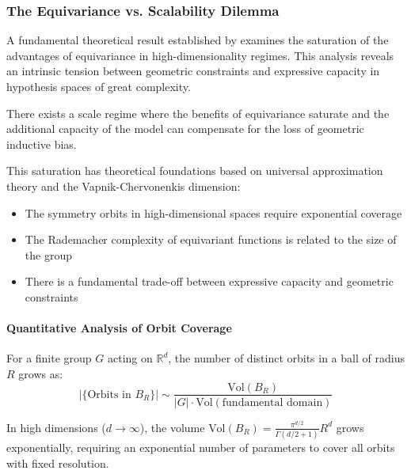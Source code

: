 \subsubsection{The Equivariance vs. Scalability Dilemma}\label{subsubsec:dilema_equivarianza_escalabilidad}

A fundamental theoretical result established by \citet{park2024equivariancescale} examines the saturation of the advantages of equivariance in high-dimensionality regimes. This analysis reveals an intrinsic tension between geometric constraints and expressive capacity in hypothesis spaces of great complexity.

\begin{hypothesis}
There exists a scale regime where the benefits of equivariance saturate and the additional capacity of the model can compensate for the loss of geometric inductive bias.
\end{hypothesis}

This saturation has theoretical foundations based on universal approximation theory and the Vapnik-Chervonenkis dimension:

\begin{itemize}
\item The symmetry orbits in high-dimensional spaces require exponential coverage
\item The Rademacher complexity of equivariant functions is related to the size of the group
\item There is a fundamental trade-off between expressive capacity and geometric constraints
\end{itemize}

\paragraph{Quantitative Analysis of Orbit Coverage}

For a finite group $G$ acting on $\mathbb{R}^d$, the number of distinct orbits in a ball of radius $R$ grows as:
\begin{equation}
|\{\text{Orbits in } B_R\}| \sim \frac{\text{Vol}(B_R)}{|G| \cdot \text{Vol}(\text{fundamental domain})}
\end{equation}

In high dimensions ($d \to \infty$), the volume $\text{Vol}(B_R) = \frac{\pi^{d/2}}{\Gamma(d/2 + 1)} R^d$ grows exponentially, requiring an exponential number of parameters to cover all orbits with fixed resolution.

